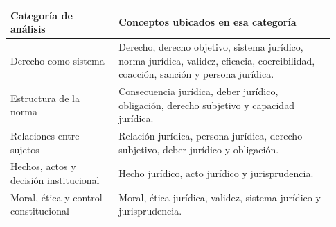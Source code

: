 \documentclass[
	spanish,
	letterpaper, oneside
]{article}
\begin{document}
\begin{center}
\small
\renewcommand{\arraystretch}{1.25}
\begin{tabular}{@{}p{0.31\linewidth}p{0.62\linewidth}@{}}
\toprule
\textbf{Categoría de análisis} & \textbf{Conceptos ubicados en esa categoría} \\
\midrule
Derecho como sistema & Derecho, derecho objetivo, sistema jurídico, norma jurídica, validez, eficacia, coercibilidad, coacción, sanción y persona jurídica. \\
Estructura de la norma & Consecuencia jurídica, deber jurídico, obligación, derecho subjetivo y capacidad jurídica. \\
Relaciones entre sujetos & Relación jurídica, persona jurídica, derecho subjetivo, deber jurídico y obligación. \\
Hechos, actos y decisión institucional & Hecho jurídico, acto jurídico y jurisprudencia. \\
Moral, ética y control constitucional & Moral, ética jurídica, validez, sistema jurídico y jurisprudencia. \\
\bottomrule
\end{tabular}
\end{center}
\end{document}
